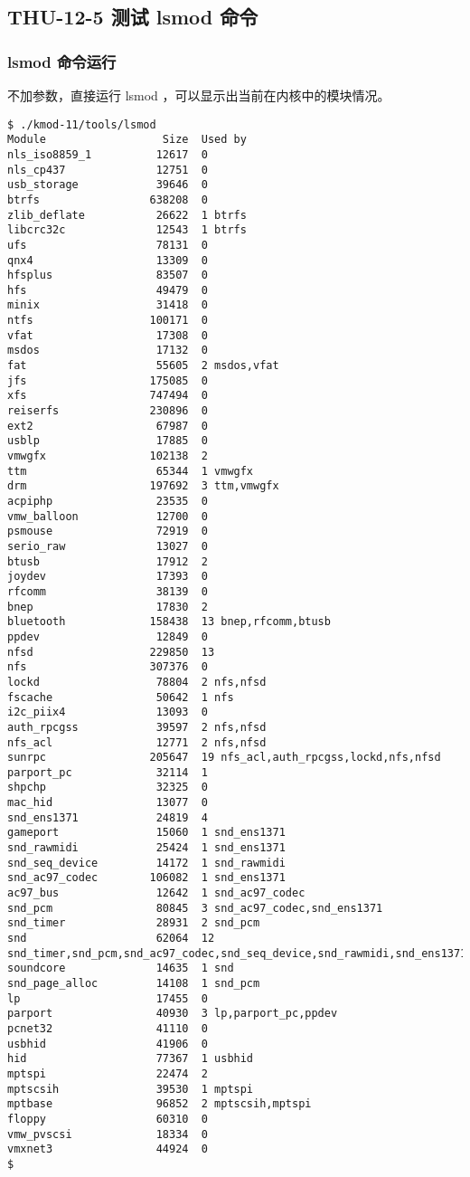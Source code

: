 \documentclass[11pt,a4paper]{article}
\begin{document}
\subsection{THU-12-5 测试 lsmod 命令}

\subsubsection{lsmod 命令运行}

不加参数，直接运行 lsmod ，可以显示出当前在内核中的模块情况。

{\begin{shaded}\begin{verbatim}
$ ./kmod-11/tools/lsmod 
Module                  Size  Used by
nls_iso8859_1          12617  0 
nls_cp437              12751  0 
usb_storage            39646  0 
btrfs                 638208  0 
zlib_deflate           26622  1 btrfs
libcrc32c              12543  1 btrfs
ufs                    78131  0 
qnx4                   13309  0 
hfsplus                83507  0 
hfs                    49479  0 
minix                  31418  0 
ntfs                  100171  0 
vfat                   17308  0 
msdos                  17132  0 
fat                    55605  2 msdos,vfat
jfs                   175085  0 
xfs                   747494  0 
reiserfs              230896  0 
ext2                   67987  0 
usblp                  17885  0 
vmwgfx                102138  2 
ttm                    65344  1 vmwgfx
drm                   197692  3 ttm,vmwgfx
acpiphp                23535  0 
vmw_balloon            12700  0 
psmouse                72919  0 
serio_raw              13027  0 
btusb                  17912  2 
joydev                 17393  0 
rfcomm                 38139  0 
bnep                   17830  2 
bluetooth             158438  13 bnep,rfcomm,btusb
ppdev                  12849  0 
nfsd                  229850  13 
nfs                   307376  0 
lockd                  78804  2 nfs,nfsd
fscache                50642  1 nfs
i2c_piix4              13093  0 
auth_rpcgss            39597  2 nfs,nfsd
nfs_acl                12771  2 nfs,nfsd
sunrpc                205647  19 nfs_acl,auth_rpcgss,lockd,nfs,nfsd
parport_pc             32114  1 
shpchp                 32325  0 
mac_hid                13077  0 
snd_ens1371            24819  4 
gameport               15060  1 snd_ens1371
snd_rawmidi            25424  1 snd_ens1371
snd_seq_device         14172  1 snd_rawmidi
snd_ac97_codec        106082  1 snd_ens1371
ac97_bus               12642  1 snd_ac97_codec
snd_pcm                80845  3 snd_ac97_codec,snd_ens1371
snd_timer              28931  2 snd_pcm
snd                    62064  12 snd_timer,snd_pcm,snd_ac97_codec,snd_seq_device,snd_rawmidi,snd_ens1371
soundcore              14635  1 snd
snd_page_alloc         14108  1 snd_pcm
lp                     17455  0 
parport                40930  3 lp,parport_pc,ppdev
pcnet32                41110  0 
usbhid                 41906  0 
hid                    77367  1 usbhid
mptspi                 22474  2 
mptscsih               39530  1 mptspi
mptbase                96852  2 mptscsih,mptspi
floppy                 60310  0 
vmw_pvscsi             18334  0 
vmxnet3                44924  0 
$ 
\end{verbatim}\end{shaded}}
\end{document}
